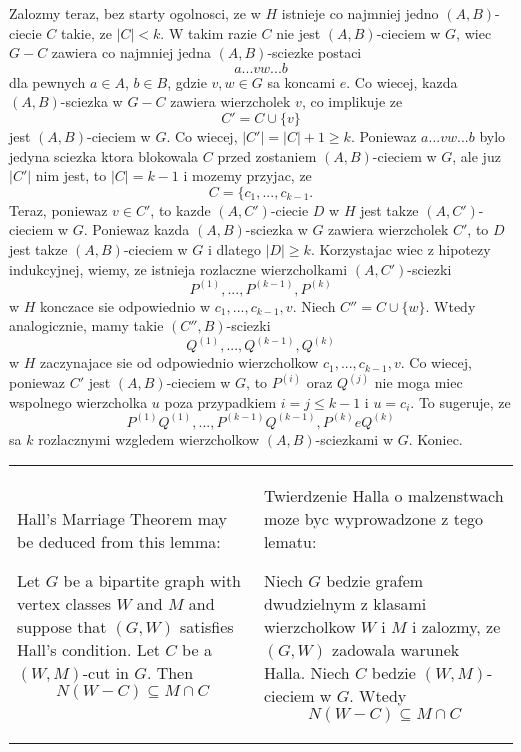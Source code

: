 Zalozmy teraz, bez starty ogolnosci, ze w $H$ istnieje co najmniej jedno $(A,B)$-ciecie $C$ takie, ze $|C|<k$. W takim razie $C$ nie jest $(A, B)$-cieciem w $G$, wiec $G-C$ zawiera co najmniej jedna $(A, B)$-sciezke postaci
$$a...vw...b$$
dla pewnych $a\in A$, $b\in B$, gdzie $v,w\in G$ sa koncami $e$. Co wiecej, kazda $(A, B)$-sciezka w $G-C$ zawiera wierzcholek $v$, co implikuje ze
$$C'=C\cup\{v\}$$
jest $(A, B)$-cieciem w $G$. Co wiecej, $|C'|=|C|+1\geq k$. {\color{dyg}Poniewaz $a...vw...b$ bylo jedyna sciezka ktora blokowala $C$ przed zostaniem $(A,B)$-cieciem w $G$, ale juz $|C'|$ nim jest}, to $|C|=k-1$ i mozemy przyjac, ze
$$C=\{c_1,...,c_{k-1}.$$
Teraz, poniewaz $v\in C'$, to kazde $(A, C')$-ciecie $D$ w $H$ jest takze $(A, C')$-cieciem w $G$. Poniewaz kazda $(A, B)$-sciezka w $G$ zawiera wierzcholek $C'$, to $D$ jest takze $(A, B)$-cieciem w $G$ i dlatego $|D|\geq k$. Korzystajac wiec z hipotezy indukcyjnej, wiemy, ze istnieja rozlaczne wierzcholkami $(A, C')$-sciezki 
$$P^{(1)},...,P^{(k-1)},P^{(k)}$$ 
w $H$ konczace sie odpowiednio w $c_1,..., c_{k-1}, v$. Niech $C''=C\cup\{w\}$. Wtedy analogicznie, mamy takie $(C'', B)$-sciezki 
$$Q^{(1)},...,Q^{{(k-1)}},Q^{(k)}$$
w $H$ zaczynajace sie od odpowiednio wierzcholkow $c_1,..., c_{k-1}, v$. Co wiecej, poniewaz $C'$ jest $(A, B)$-cieciem w $G$, to $P^{(i)}$ oraz $Q^{(j)}$ nie moga miec wspolnego wierzcholka $u$ poza przypadkiem $i=j\leq k-1$ i $u=c_i$. To sugeruje, ze 
$$P^{(1)}Q^{(1)},...,P^{(k-1)}Q^{(k-1)},P^{(k)}eQ^{(k)}$$
sa $k$ rozlacznymi wzgledem wierzcholkow $(A, B)$-sciezkami w $G$. Koniec.
\bigskip

\bigskip

\begin{tabularx}{\textwidth}{ X!{\color{git90gray}\vrule} X}

    Hall's Marriage Theorem may be deduced from this lemma:

    Let $G$ be a bipartite graph with vertex classes $W$ and $M$ and suppose that $(G, W)$ satisfies Hall's condition. Let $C$ be a $(W, M)$-cut in $G$. Then 
    $$N(W-C)\subseteq M\cap C$$

    &

    Twierdzenie Halla o malzenstwach moze byc wyprowadzone z tego lematu:

    Niech $G$ bedzie grafem dwudzielnym z klasami wierzcholkow $W$ i $M$ i zalozmy, ze $(G, W)$ zadowala warunek Halla. Niech $C$ bedzie $(W, M)$-cieciem w $G$. Wtedy
    $$N(W-C)\subseteq M\cap C$$

\end{tabularx}

